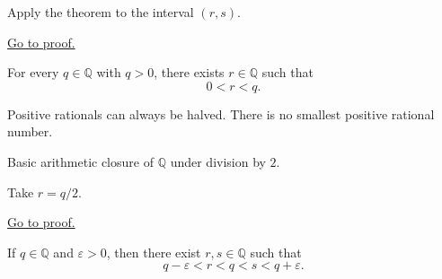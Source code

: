\begin{remark*}
Apply the theorem to the interval $(r,s)$.
\end{remark*}

\begin{remark*}[Proof]
\hyperref[prf:q-has-no-adjacent-points]{Go to proof.}
\end{remark*}

\begin{tcolorbox}[colback=thmbox, colframe=thmborder, arc=2pt,
  left=6pt, right=6pt, top=4pt, bottom=4pt,
  title={\small\textbf{Theorem ($\mathbb{Q}$ Has No Minimum Positive Element)}},
  fonttitle=\small\bfseries]
\begin{theorem}
\label{thm:q-has-no-minimum-positive-element}
For every $q\in\mathbb{Q}$ with $q>0$, there exists $r\in\mathbb{Q}$ such that
\[
0<r<q.
\]
\end{theorem}
\end{tcolorbox}

\begin{remark*}[Interpretation]
Positive rationals can always be halved.  There is no smallest positive
rational number.
\end{remark*}

\begin{remark*}[Dependencies]
Basic arithmetic closure of $\mathbb{Q}$ under division by $2$.
\end{remark*}

\begin{remark*}
Take $r=q/2$.
\end{remark*}

\begin{remark*}[Proof]
\hyperref[prf:q-has-no-minimum-positive-element]{Go to proof.}
\end{remark*}

\begin{tcolorbox}[colback=thmbox, colframe=thmborder, arc=2pt,
  left=6pt, right=6pt, top=4pt, bottom=4pt,
  title={\small\textbf{Lemma (Upper/Lower Perturbation Lemma, Rational Version)}},
  fonttitle=\small\bfseries]
\begin{lemma}
\label{lem:rational-upper-lower-perturbation}
If $q\in\mathbb{Q}$ and $\varepsilon>0$, then there exist $r,s\in\mathbb{Q}$
such that
\[
q-\varepsilon < r < q < s < q+\varepsilon.
\]
\end{lemma}
\end{tcolorbox}

